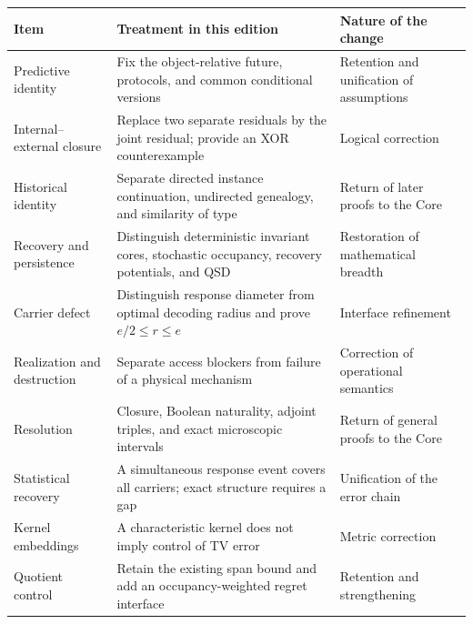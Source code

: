\documentclass[
  english,
  11pt,
  oneside]{book}
\newcounter{none} %
\begin{document}
{\def\LTcaptype{none} %
\begin{longtable}[]{@{}
  >{\raggedright\arraybackslash}p{}
  >{\raggedright\arraybackslash}p{}
  >{\raggedright\arraybackslash}p{}@{}}
\toprule\noalign{}
\begin{minipage}[b]{\linewidth}\raggedright
Item
\end{minipage} & \begin{minipage}[b]{\linewidth}\raggedright
Treatment in this edition
\end{minipage} & \begin{minipage}[b]{\linewidth}\raggedright
Nature of the change
\end{minipage} \\
\midrule\noalign{}
\endhead
\bottomrule\noalign{}
\endlastfoot
Predictive identity & Fix the object-relative future, protocols, and common conditional versions & Retention and unification of assumptions \\
Internal--external closure & Replace two separate residuals by the joint residual; provide an XOR counterexample & Logical correction \\
Historical identity & Separate directed instance continuation, undirected genealogy, and similarity of type & Return of later proofs to the Core \\
Recovery and persistence & Distinguish deterministic invariant cores, stochastic occupancy, recovery potentials, and QSD & Restoration of mathematical breadth \\
Carrier defect & Distinguish response diameter from optimal decoding radius and prove \(e/2\le r\le e\) & Interface refinement \\
Realization and destruction & Separate access blockers from failure of a physical mechanism & Correction of operational semantics \\
Resolution & Closure, Boolean naturality, adjoint triples, and exact microscopic intervals & Return of general proofs to the Core \\
Statistical recovery & A simultaneous response event covers all carriers; exact structure requires a gap & Unification of the error chain \\
Kernel embeddings & A characteristic kernel does not imply control of TV error & Metric correction \\
Quotient control & Retain the existing span bound and add an occupancy-weighted regret interface & Retention and strengthening \\

\end{longtable}}
\end{document}
